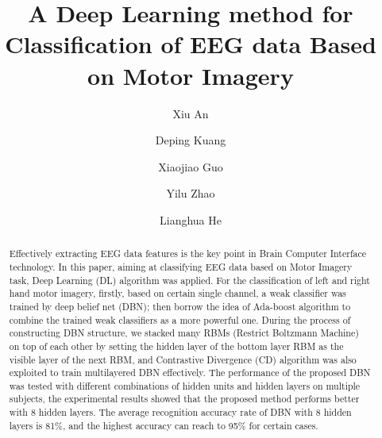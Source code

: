 \documentclass{llncs}
\begin{document}
%
\frontmatter          %
%
\pagestyle{headings}  %
%

%
\mainmatter              %
%
\title{A Deep Learning method for Classification of EEG data Based on Motor Imagery }
%
%
\author{Xiu An \and Deping Kuang \and Xiaojiao Guo \and Yilu Zhao
 \and  Lianghua He}
%
%
%
\maketitle              %

\begin{abstract}
Effectively extracting EEG data features is the key point in Brain Computer Interface technology. In this paper, aiming at classifying EEG data based on Motor Imagery task, Deep Learning (DL) algorithm was applied. For the classification of left and right hand motor imagery, firstly, based on certain single channel, a weak classifier was trained by deep belief net (DBN); then borrow the idea of Ada-boost algorithm to combine the trained weak classifiers as a more powerful one. During the process of constructing DBN structure, we stacked many RBMs (Restrict Boltzmann Machine) on top of each other by setting the hidden layer of the bottom layer RBM as the visible layer of the next RBM, and Contrastive Divergence (CD) algorithm was also exploited to train multilayered DBN effectively. The performance of the proposed DBN was tested with different combinations of hidden units and hidden layers on multiple subjects, the experimental results showed that the proposed method performs better with 8 hidden layers. The average recognition accuracy rate of DBN with 8 hidden layers is 81\%, and the highest accuracy can reach to 95\% for certain cases.
\end{abstract}
%
\end{document}
